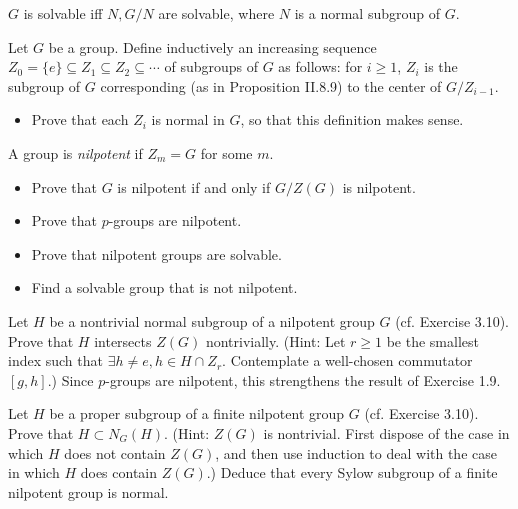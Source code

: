 \documentclass[openany]{book}
\begin{document}
\begin{prob}
    $G$ is solvable iff $N, G/N$ are solvable, where $N$ is a normal subgroup of $G$.
\end{prob}




\begin{prob}[3.10]
    Let $G$ be a group. Define inductively an increasing sequence $Z_0 = \{e\} \subseteq Z_1 \subseteq Z_2 \subseteq \cdots$ of subgroups of $G$ as follows: for $i \geq 1$, $Z_i$ is the subgroup of $G$ corresponding (as in Proposition II.8.9) to the center of $G / Z_{i-1}$.

\begin{itemize}
    \item Prove that each $Z_i$ is normal in $G$, so that this definition makes sense.
\end{itemize}

A group is \emph{nilpotent} if $Z_m = G$ for some $m$.

\begin{itemize}
    \item Prove that $G$ is nilpotent if and only if $G / Z(G)$ is nilpotent.
    \item Prove that $p$-groups are nilpotent.
    \item Prove that nilpotent groups are solvable.
    \item Find a solvable group that is not nilpotent.
\end{itemize}
\end{prob}


\begin{prob}[3.11]
    Let $H$ be a nontrivial normal subgroup of a nilpotent group $G$ (cf. Exercise 3.10). Prove that $H$ intersects $Z(G)$ nontrivially. (Hint: Let $r \geq 1$ be the smallest index such that $\exists h \neq e, h \in H \cap Z_r$. Contemplate a well-chosen commutator $[g, h]$.) Since $p$-groups are nilpotent, this strengthens the result of Exercise 1.9.
\end{prob}

\begin{prob}[3.12]
    Let $H$ be a proper subgroup of a finite nilpotent group $G$ (cf. Exercise 3.10). Prove that $H \subset N_G(H)$. (Hint: $Z(G)$ is nontrivial. First dispose of the case in which $H$ does not contain $Z(G)$, and then use induction to deal with the case in which $H$ does contain $Z(G)$.) Deduce that every Sylow subgroup of a finite nilpotent group is normal.
\end{prob}
\end{document}
